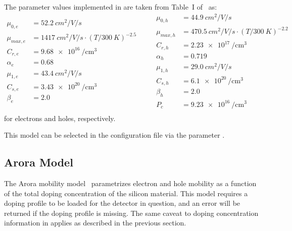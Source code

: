 The parameter values implemented in \apsq are taken from Table~I of~\cite{masetti} as:
\begin{equation*}
    \begin{split}
        \mu_{0,e}   &= \SI{52.2}{cm^2 \per V \per s}\\
        \mu_{max,e} &= \SI{1417}{cm^2 \per V \per s} \cdot (T / \SI{300}{K})^{-2.5}\\
        C_{r,e}     &= \SI{9.68e16}{\per \cubic \cm}\\
        \alpha_{e}  &= 0.68\\
        \mu_{1,e}   &= \SI{43.4}{cm^2 \per V \per s}\\
        C_{s,e}     &= \SI{3.43e20}{\per \cubic \cm}\\
        \beta_{e}   &= 2.0\\
    \end{split}
    \qquad
    \begin{split}
        \mu_{0,h}   &= \SI{44.9}{cm^2 \per V \per s}\\
        \mu_{max,h} &= \SI{470.5}{cm^2 \per V \per s} \cdot (T / \SI{300}{K})^{-2.2}\\
        C_{r,h}     &= \SI{2.23e17}{\per \cubic \cm}\\
        \alpha_{h}  &= 0.719\\
        \mu_{1,h}   &= \SI{29.0}{cm^2 \per V \per s}\\
        C_{s,h}     &= \SI{6.1e20}{\per \cubic \cm}\\
        \beta_{h}   &= 2.0\\
        P_{c}       &= \SI{9.23e16}{\per \cubic \cm}\\
    \end{split}
\end{equation*}
for electrons and holes, respectively.

This model can be selected in the configuration file via the parameter .


\subsection{Arora Model}

The Arora mobility model~\cite{arora} parametrizes electron and hole mobility as a function of the total doping concentration of the silicon material.
This model requires a doping profile to be loaded for the detector in question, and an error will be returned if the doping profile is missing.
The same caveat to doping concentration information in \apsq applies as described in the previous section.

